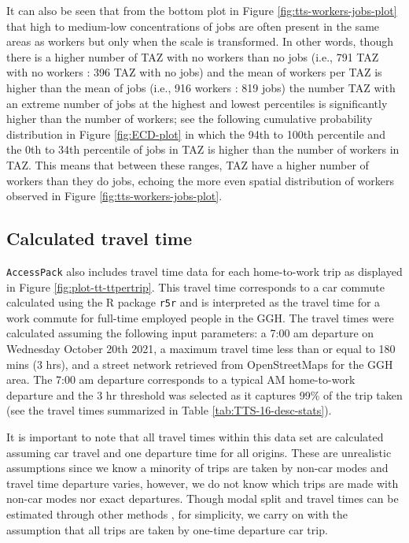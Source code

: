 \documentclass[Royal,times,sageh]{sagej}
\begin{document}
It can also be seen that from the bottom plot in Figure
\ref{fig:tts-workers-jobs-plot} that high to medium-low concentrations
of jobs are often present in the same areas as workers but only when the
scale is transformed. In other words, though there is a higher number of
TAZ with no workers than no jobs (i.e., 791 TAZ with no workers : 396
TAZ with no jobs) and the mean of workers per TAZ is higher than the
mean of jobs (i.e., 916 workers : 819 jobs) the number TAZ with an
extreme number of jobs at the highest and lowest percentiles is
significantly higher than the number of workers; see the following
cumulative probability distribution in Figure \ref{fig:ECD-plot} in
which the 94th to 100th percentile and the 0th to 34th percentile of
jobs in TAZ is higher than the number of workers in TAZ. This means that
between these ranges, TAZ have a higher number of workers than they do
jobs, echoing the more even spatial distribution of workers observed in
Figure \ref{fig:tts-workers-jobs-plot}.

\newpage

\hypertarget{calculated-travel-time}{%
\subsection{Calculated travel time}\label{calculated-travel-time}}

\texttt{AccessPack} also includes travel time data for each home-to-work
trip as displayed in Figure \ref{fig:plot-tt-ttpertrip}. This travel
time corresponds to a car commute calculated using the R package
\texttt{r5r} \citep{r5r_2021} and is interpreted as the travel time for
a work commute for full-time employed people in the GGH. The travel
times were calculated assuming the following input parameters: a 7:00 am
departure on Wednesday October 20th 2021, a maximum travel time less
than or equal to 180 mins (3 hrs), and a street network retrieved from
OpenStreetMaps for the GGH area. The 7:00 am departure corresponds to a
typical AM home-to-work departure and the 3 hr threshold was selected as
it captures 99\% of the trip taken (see the travel times summarized in
Table \ref{tab:TTS-16-desc-stats}).

It is important to note that all travel times within this data set are
calculated assuming car travel and one departure time for all origins.
These are unrealistic assumptions since we know a minority of trips are
taken by non-car modes and travel time departure varies, however, we do
not know which trips are made with non-car modes nor exact departures.
Though modal split and travel times can be estimated through other
methods \citep[e.g.,][]{allen_suburbanization_2021, higgins2021changes},
for simplicity, we carry on with the assumption that all trips are taken
by one-time departure car trip.
\end{document}
